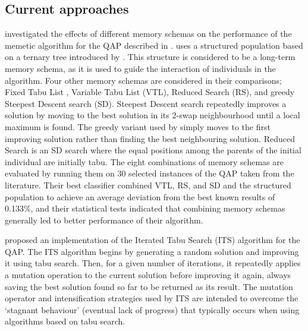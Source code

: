 \subsection{Current approaches} {
    \label{sec:approaches}




	\citet{Meneses:2011hg} investigated the effects of different memory schemas on the performance of the memetic algorithm \citep{Neri:2012jr} for the QAP described in \citet{Inostroza:2008md}.
	\citeauthor{Meneses:2011hg} uses a structured population based on a ternary tree introduced by \citet{Inostroza:2008md}. This structure is considered to be a long-term memory schema, as it is used to guide the interaction of individuals in the algorithm.
	Four other memory schemas are considered in their comparisons; Fixed Tabu List \citep{glover1989tabu}, Variable Tabu List (VTL), Reduced Search (RS), and greedy Steepest Descent search (SD).
	Steepest Descent search repeatedly improves a solution by moving to the best solution in its 2-swap neighbourhood until a local maximum is found. The greedy variant used by \citeauthor{Meneses:2011hg} simply moves to the first improving solution rather than finding the best neighbouring solution.
	Reduced Search is an SD search where the equal positions among the parents of the initial individual are initially tabu.
	The eight combinations of memory schemas are evaluated by running them on 30 selected instances of the QAP taken from the literature.
	Their best classifier combined VTL, RS, and SD and the structured population to achieve an average deviation from the best known results of 0.133\%, and their statistical tests indicated that combining memory schemas generally led to better performance of their algorithm.





	\citet{Misevicius:2012dj} proposed an implementation of the Iterated Tabu Search (ITS) algorithm for the QAP.
	The ITS algorithm begins by generating a random solution and improving it using tabu search. Then, for a given number of iterations, it repeatedly applies a mutation operation to the current solution before improving it again, always saving the best solution found so far to be returned as its result. The mutation operator and intensification strategies used by ITS are intended to overcome the `stagnant behaviour' (eventual lack of progress) that typically occurs when using algorithms based on tabu search.

}
